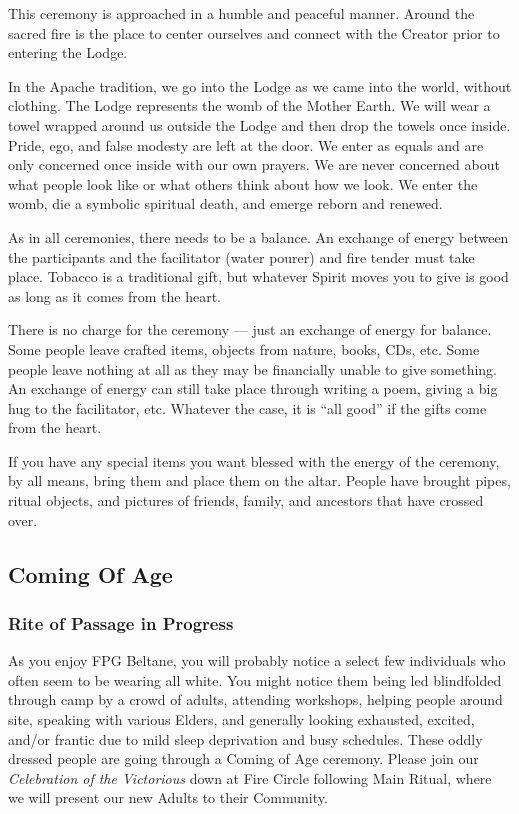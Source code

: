 \documentclass[9pt,twoside,openright,final,article,letterpaper]{memoir}
\renewcommand{\pfbreakdisplay}{%
  \needspace{24pt}%
  \vspace{8pt}\\\ding{76}\quad\ding{77}\quad\ding{78}\\%
  \vspace{11pt}}
\let\oldsubsection=\subsection
\renewcommand{\subsection}[1]{%
  \vspace{6pt}
  \needspace{1.25in}
  \oldsubsection{#1}
  \nopagebreak}
\let\oldsubsubsection=\subsubsection
\renewcommand{\subsubsection}[1]{%
  \needspace{.75in}
  \oldsubsubsection{#1}
  \nopagebreak}
\begin{document}
\begin{multicols}{2}
  This ceremony is approached in a humble and peaceful manner. Around
  the sacred fire is the place to center ourselves and connect with
  the Creator prior to entering the Lodge.

  In the Apache tradition, we go into the Lodge as we came into the
  world, without clothing.  The Lodge represents the womb of the
  Mother Earth. We will wear a towel wrapped around us outside the
  Lodge and then drop the towels once inside. Pride, ego, and false
  modesty are left at the door. We enter as equals and are only
  concerned once inside with our own prayers. We are never concerned
  about what people look like or what others think about how we
  look. We enter the womb, die a symbolic spiritual death, and emerge
  reborn and renewed.

  As in all ceremonies, there needs to be a balance. An exchange of
  energy between the participants and the facilitator (water pourer)
  and fire tender must take place. Tobacco is a traditional gift, but
  whatever Spirit moves you to give is good as long as it comes from
  the heart.

  There is no charge for the ceremony --- just an exchange of energy
  for balance. Some people leave crafted items, objects from nature,
  books, CDs, etc. Some people leave nothing at all as they may be
  financially unable to give something. An exchange of energy can
  still take place through writing a poem, giving a big hug to the
  facilitator, etc. Whatever the case, it is ``all good'' if the gifts
  come from the heart.

  If you have any special items you want blessed with the energy of
  the ceremony, by all means, bring them and place them on the
  altar. People have brought pipes, ritual objects, and pictures of
  friends, family, and ancestors that have crossed over.


  \subsection{Coming Of Age}

  \subsubsection{Rite of Passage in Progress}

  As you enjoy FPG Beltane, you will probably notice a select few
  individuals who often seem to be wearing all white. You might notice
  them being led blindfolded through camp by a crowd of adults,
  attending workshops, helping people around site, speaking with
  various Elders, and generally looking exhausted, excited, and/or
  frantic due to mild sleep deprivation and busy schedules. These
  oddly dressed people are going through a Coming of Age
  ceremony. Please join our \emph{Celebration of the Victorious} down
  at Fire Circle following Main Ritual, where we will present our new
  Adults to their Community.


\end{multicols}
\end{document}
